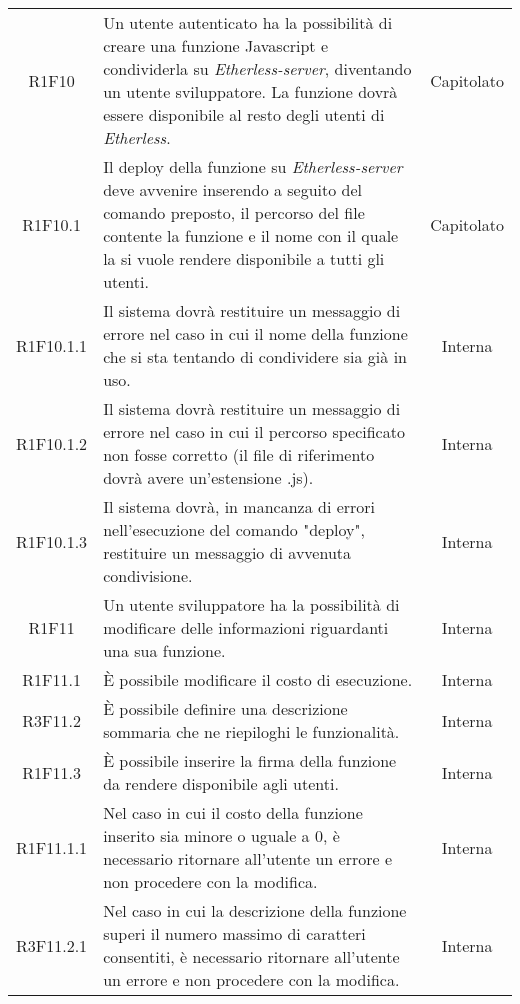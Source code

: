 \begin{longtable}{|c|p{8cm}|c|}
	R1F10 &  Un utente autenticato ha la possibilità di creare una funzione Javascript e condividerla su \textit{Etherless-server}, diventando un utente sviluppatore. La funzione dovrà essere disponibile al resto degli utenti di \textit{Etherless}. & Capitolato \\
	
	R1F10.1 &  Il deploy della funzione su \textit{Etherless-server} deve avvenire inserendo a seguito del comando preposto, il percorso del file contente la funzione e il nome con il quale la si vuole rendere disponibile a tutti gli utenti. & Capitolato \\
	
	R1F10.1.1 &  Il sistema dovrà restituire un messaggio di errore nel caso in cui il nome della funzione che si sta tentando di condividere sia già in uso. & Interna \\
	
	R1F10.1.2 &  Il sistema dovrà restituire un messaggio di errore nel caso in cui il percorso specificato non fosse corretto (il file di riferimento dovrà avere un'estensione .js). & Interna \\
	
	R1F10.1.3 &  Il sistema dovrà, in mancanza di errori nell'esecuzione del comando "deploy", restituire un messaggio di avvenuta condivisione. & Interna \\
	
	R1F11 &  Un utente sviluppatore ha la possibilità di modificare delle informazioni riguardanti una sua funzione. & Interna \\
	
	R1F11.1 &  È possibile modificare il costo di esecuzione. & Interna \\
	
	R3F11.2 &  È possibile definire una descrizione sommaria che ne riepiloghi le funzionalità. & Interna \\
	
	R1F11.3 &  È possibile inserire la firma della funzione da rendere disponibile agli utenti. & Interna \\
	
	R1F11.1.1 &  Nel caso in cui il costo della funzione inserito sia minore o uguale a 0, è necessario ritornare all'utente un errore e non procedere con la modifica. & Interna \\
	
	R3F11.2.1 &  Nel caso in cui la descrizione della funzione superi il numero massimo di caratteri consentiti, è necessario ritornare all'utente un errore e non procedere con la modifica. & Interna \\
	

\end{longtable}

